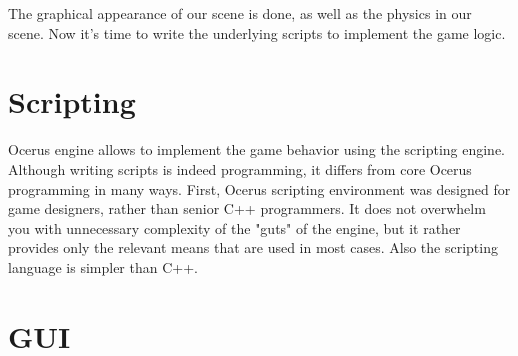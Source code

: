 \documentclass[a4paper,12pt]{article}
\begin{document}
The graphical appearance of our scene is done, as well as the physics in our scene. Now it's time to write the underlying scripts to implement the game logic.

\section{Scripting}
Ocerus engine allows to implement the game behavior using the scripting engine. Although writing scripts is indeed programming, it differs from core Ocerus programming in many ways. First, Ocerus scripting environment was designed for game designers, rather than senior C++ programmers. It does not overwhelm you with unnecessary complexity of the "guts" of the engine, but it rather provides only the relevant means that are used in most cases. Also the scripting language is simpler than C++.

\section{GUI}
\end{document}
